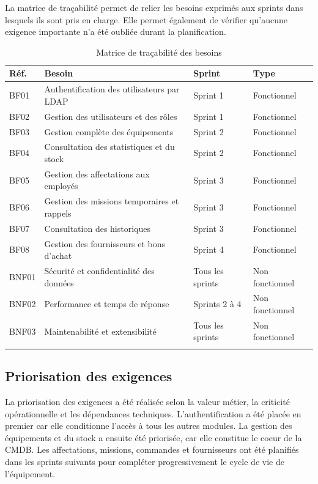 La matrice de traçabilité permet de relier les besoins exprimés aux sprints dans lesquels ils sont pris en charge. Elle permet également de vérifier qu'aucune exigence importante n'a été oubliée durant la planification.

\begin{longtable}{|m{2cm}|m{5.5cm}|m{3cm}|m{3cm}|}
\hline
\textbf{Réf.} & \textbf{Besoin} & \textbf{Sprint} & \textbf{Type} \\
\hline
\endhead
\endfoot
\endlastfoot
\hline
BF01 & Authentification des utilisateurs par LDAP & Sprint 1 & Fonctionnel \\
\hline
BF02 & Gestion des utilisateurs et des rôles & Sprint 1 & Fonctionnel \\
\hline
BF03 & Gestion complète des équipements & Sprint 2 & Fonctionnel \\
\hline
BF04 & Consultation des statistiques et du stock & Sprint 2 & Fonctionnel \\
\hline
BF05 & Gestion des affectations aux employés & Sprint 3 & Fonctionnel \\
\hline
BF06 & Gestion des missions temporaires et rappels & Sprint 3 & Fonctionnel \\
\hline
BF07 & Consultation des historiques & Sprint 3 & Fonctionnel \\
\hline
BF08 & Gestion des fournisseurs et bons d'achat & Sprint 4 & Fonctionnel \\
\hline
BNF01 & Sécurité et confidentialité des données & Tous les sprints & Non fonctionnel \\
\hline
BNF02 & Performance et temps de réponse & Sprints 2 à 4 & Non fonctionnel \\
\hline
BNF03 & Maintenabilité et extensibilité & Tous les sprints & Non fonctionnel \\
\hline
\captionsetup{justification=centering,margin=1cm}
\caption{Matrice de traçabilité des besoins}
\end{longtable}

\subsection{Priorisation des exigences}

La priorisation des exigences a été réalisée selon la valeur métier, la criticité opérationnelle et les dépendances techniques. L'authentification a été placée en premier car elle conditionne l'accès à tous les autres modules. La gestion des équipements et du stock a ensuite été priorisée, car elle constitue le coeur de la CMDB. Les affectations, missions, commandes et fournisseurs ont été planifiés dans les sprints suivants pour compléter progressivement le cycle de vie de l'équipement.

